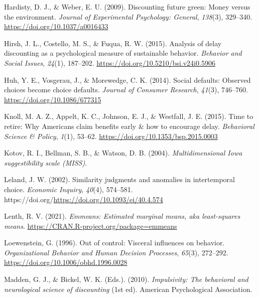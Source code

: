 \documentclass[
  pub,floatsintext]{apa6}
\newlength{\cslhangindent}
\newlength{\cslentryspacingunit} %
\newenvironment{CSLReferences}[2] %
 {%
  \setlength{\parindent}{0pt}
  \ifodd #1
  \let\oldpar\par
  \def\par{\hangindent=\cslhangindent\oldpar}
  \fi
  \setlength{\parskip}{#2\cslentryspacingunit}
 }%
 {}
\begin{document}
\begin{CSLReferences}{1}{0}
\leavevmode{}%
Hardisty, D. J., \& Weber, E. U. (2009). Discounting future green: {Money} versus the environment. \emph{Journal of Experimental Psychology: General}, \emph{138}(3), 329--340. \url{https://doi.org/10.1037/a0016433}

\leavevmode{}%
Hirsh, J. L., Costello, M. S., \& Fuqua, R. W. (2015). Analysis of delay discounting as a psychological measure of sustainable behavior. \emph{Behavior and Social Issues}, \emph{24}(1), 187--202. \url{https://doi.org/10.5210/bsi.v24i0.5906}

\leavevmode{}%
Huh, Y. E., Vosgerau, J., \& Morewedge, C. K. (2014). Social defaults: {Observed} choices become choice defaults. \emph{Journal of Consumer Research}, \emph{41}(3), 746--760. \url{https://doi.org/10.1086/677315}

\leavevmode{}%
Knoll, M. A. Z., Appelt, K. C., Johnson, E. J., \& Westfall, J. E. (2015). Time to retire: {Why} {Americans} claim benefits early \& how to encourage delay. \emph{Behavioral Science \& Policy}, \emph{1}(1), 53--62. \url{https://doi.org/10.1353/bsp.2015.0003}

\leavevmode{}%
Kotov, R. I., Bellman, S. B., \& Watson, D. B. (2004). \emph{Multidimensional {Iowa} suggestibility scale ({MISS})}.

\leavevmode{}%
Leland, J. W. (2002). Similarity judgments and anomalies in intertemporal choice. \emph{Economic Inquiry}, \emph{40}(4), 574--581. https://doi.org/\url{https://doi.org/10.1093/ei/40.4.574}

\leavevmode{}%
Lenth, R. V. (2021). \emph{Emmeans: Estimated marginal means, aka least-squares means}. \url{https://CRAN.R-project.org/package=emmeans}

\leavevmode{}%
Loewenstein, G. (1996). Out of control: {Visceral} influences on behavior. \emph{Organizational Behavior and Human Decision Processes}, \emph{65}(3), 272--292. \url{https://doi.org/10.1006/obhd.1996.0028}

\leavevmode{}%
Madden, G. J., \& Bickel, W. K. (Eds.). (2010). \emph{Impulsivity: The behavioral and neurological science of discounting} (1st ed). American Psychological Association.


\end{CSLReferences}
\end{document}
